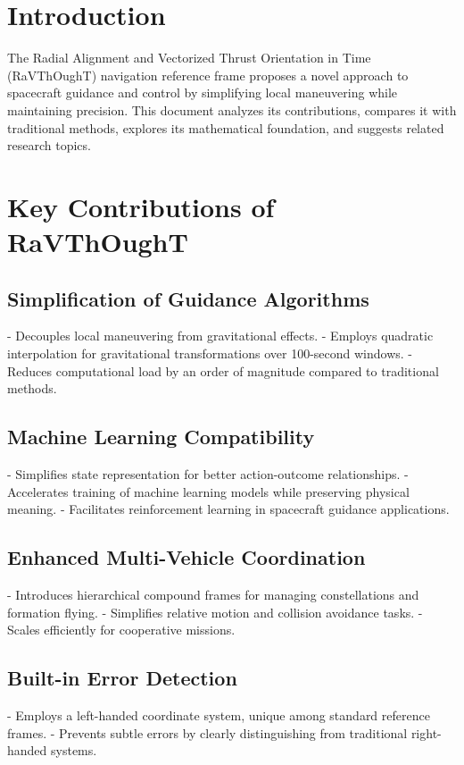 % 

\section{Introduction}

The Radial Alignment and Vectorized Thrust Orientation in Time (RaVThOughT) navigation reference frame proposes a novel approach to spacecraft guidance and control by simplifying local maneuvering while maintaining precision. This document analyzes its contributions, compares it with traditional methods, explores its mathematical foundation, and suggests related research topics.

\section{Key Contributions of RaVThOughT}

\subsection{Simplification of Guidance Algorithms}
- Decouples local maneuvering from gravitational effects.
- Employs quadratic interpolation for gravitational transformations over 100-second windows.
- Reduces computational load by an order of magnitude compared to traditional methods.

\subsection{Machine Learning Compatibility}
- Simplifies state representation for better action-outcome relationships.
- Accelerates training of machine learning models while preserving physical meaning.
- Facilitates reinforcement learning in spacecraft guidance applications.

\subsection{Enhanced Multi-Vehicle Coordination}
- Introduces hierarchical compound frames for managing constellations and formation flying.
- Simplifies relative motion and collision avoidance tasks.
- Scales efficiently for cooperative missions.

\subsection{Built-in Error Detection}
- Employs a left-handed coordinate system, unique among standard reference frames.
- Prevents subtle errors by clearly distinguishing from traditional right-handed systems.

